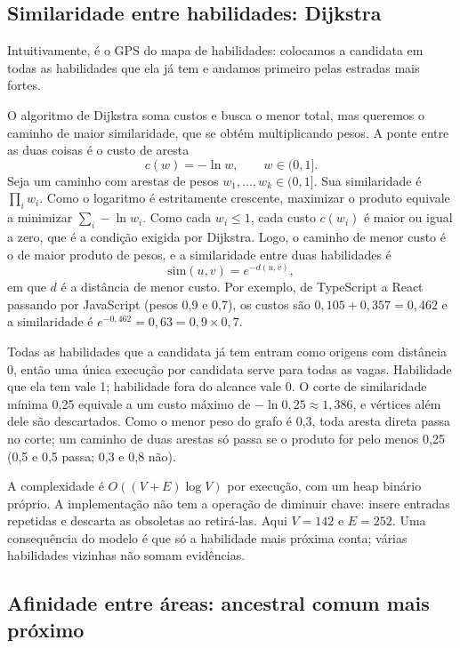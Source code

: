 \documentclass[12pt]{article}
\begin{document}
\subsection{Similaridade entre habilidades: Dijkstra}

Intuitivamente, é o GPS do mapa de habilidades: colocamos a candidata em todas as habilidades que ela já tem e andamos primeiro pelas estradas mais fortes.

O algoritmo de Dijkstra soma custos e busca o menor total, mas queremos o caminho de maior similaridade, que se obtém multiplicando pesos. A ponte entre as duas coisas é o custo de aresta
\begin{equation}
c(w) = -\ln w, \qquad w \in (0,1].
\end{equation}
Seja um caminho com arestas de pesos $w_1,\dots,w_k \in (0,1]$. Sua similaridade é $\prod_i w_i$. Como o logaritmo é estritamente crescente, maximizar o produto equivale a minimizar $\sum_i -\ln w_i$. Como cada $w_i \le 1$, cada custo $c(w_i)$ é maior ou igual a zero, que é a condição exigida por Dijkstra. Logo, o caminho de menor custo é o de maior produto de pesos, e a similaridade entre duas habilidades é
\begin{equation}
\mathrm{sim}(u,v) = e^{-d(u,v)},
\end{equation}
em que $d$ é a distância de menor custo. Por exemplo, de TypeScript a React passando por JavaScript (pesos 0,9 e 0,7), os custos são $0{,}105 + 0{,}357 = 0{,}462$ e a similaridade é $e^{-0{,}462} = 0{,}63 = 0{,}9 \times 0{,}7$.

Todas as habilidades que a candidata já tem entram como origens com distância 0, então uma única execução por candidata serve para todas as vagas. Habilidade que ela tem vale 1; habilidade fora do alcance vale 0. O corte de similaridade mínima 0,25 equivale a um custo máximo de $-\ln 0{,}25 \approx 1{,}386$, e vértices além dele são descartados. Como o menor peso do grafo é 0,3, toda aresta direta passa no corte; um caminho de duas arestas só passa se o produto for pelo menos 0,25 (0,5 e 0,5 passa; 0,3 e 0,8 não).

A complexidade é $O((V+E)\log V)$ por execução, com um heap binário próprio. A implementação não tem a operação de diminuir chave: insere entradas repetidas e descarta as obsoletas ao retirá-las. Aqui $V = 142$ e $E = 252$. Uma consequência do modelo é que só a habilidade mais próxima conta; várias habilidades vizinhas não somam evidências.

\subsection{Afinidade entre áreas: ancestral comum mais próximo}
\label{sec:lca}
\end{document}
